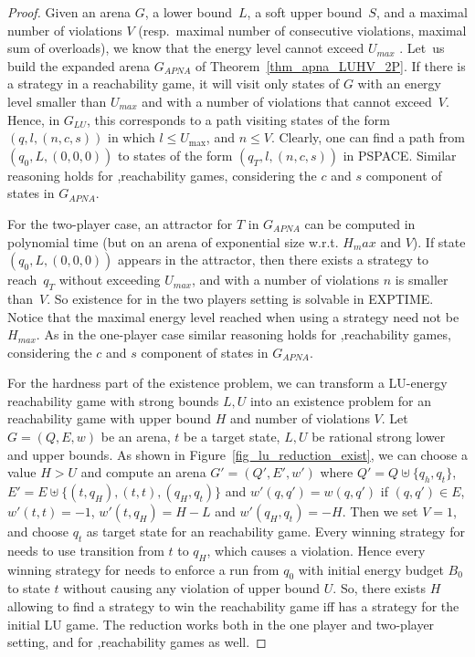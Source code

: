 \begin{proof}
 Given an arena $G$, a lower bound~$L$, a soft
  upper bound~$S$, and a maximal number of violations $V$
  (resp.~maximal number of consecutive violations, maximal sum of
  overloads), we know that the energy level cannot exceed $U_{max}$ . Let~us build the expanded arena $G_{APNA}$ of
  Theorem~\ref{thm_apna_LUHV_2P}. If there is a strategy in a
  \LVenergynb reachability game, it will visit only states of $G$ with an energy level smaller than $U_{max}$ and with a number of
  violations that cannot exceed~$V$. Hence, in $G_{LU}$, this
  corresponds to a path visiting states of the form $(q,l,(n,c,s))$ in which $l \leq U_{\max}$, and $n\leq V$. Clearly, one can find a path from $(q_0,L,(0,0,0))$ to states of the form $(q_T, l, (n,c,s))$ in PSPACE. Similar reasoning holds for \LVenergyconsnb,\LVenergysum reachability games, considering the $c$ and $s$ component of states in $G_{APNA}$.

For the two-player case, an attractor for $T$ in $G_{APNA}$ can be computed in polynomial time (but on an arena of exponential size w.r.t. $H_max$ and $V$). If state $(q_0,L,(0,0,0))$ appears in the attractor, then there exists a strategy to reach~$q_T$ without exceeding $U_{max}$, and with a number of violations $n$ is smaller than~$V$. So existence for \LVenergyconsnb in the two players setting is solvable in EXPTIME. Notice that the maximal energy level reached when using a strategy need not be $H_{max}$. As in the one-player case similar reasoning holds for \LVenergyconsnb,\LVenergysum reachability games, considering the $c$ and $s$ component of states in $G_{APNA}$.




For the hardness part of the existence problem, we can transform a
LU-energy reachability game with strong bounds $L,U$ into an existence problem for an \LVenergynb reachability game with upper bound $H$ and number of violations $V$. Let $G=(Q,E,w)$ be an arena, $t$ be a target state, $L,U$ be rational strong lower and upper bounds. As shown in Figure~\ref{fig_lu_reduction_exist}, we can choose a value $H>U$ and compute an arena $G'=(Q',E',w')$ where $Q' = Q \uplus \{q_h, q_t\}$, $E'=E \uplus \{ (t,q_H),(t,t),(q_H,q_t) \}$ and $w'(q,q') = w(q,q')$ if $(q,q')\in E$, $w'(t,t)=-1$, $w'(t,q_H)=H-L$ and $w'(q_H,q_t)=-H$. Then we set $V=1$, and choose $q_t$ as target state for an \LVenergynb reachability game. Every winning strategy for  needs to use transition from $t$ to $q_H$, which causes a violation. Hence every winning strategy for  needs to enforce a run from $q_0$ with initial energy budget $B_0$ to state $t$ without causing any violation of upper bound $U$. So, there exists $H$ allowing to find a strategy to win the \LVenergynb reachability game iff  has a strategy for the initial LU game. The reduction works both in the one player and two-player setting, and for \LVenergyconsnb,\LVenergysum reachability games as well.


\end{proof}
